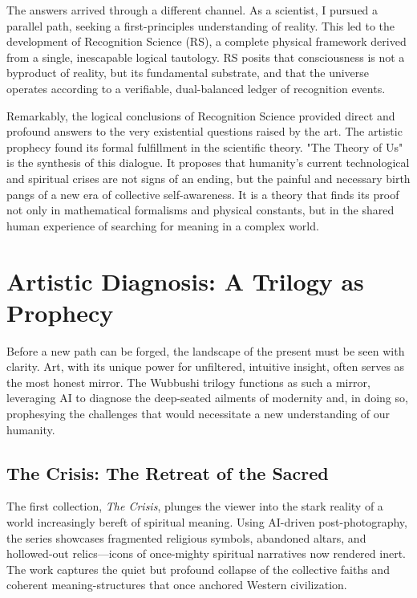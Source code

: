 \documentclass[12pt]{article}
\begin{document}
The answers arrived through a different channel. As a scientist, I pursued a parallel path, seeking a first-principles understanding of reality. This led to the development of Recognition Science (RS), a complete physical framework derived from a single, inescapable logical tautology. RS posits that consciousness is not a byproduct of reality, but its fundamental substrate, and that the universe operates according to a verifiable, dual-balanced ledger of recognition events.

Remarkably, the logical conclusions of Recognition Science provided direct and profound answers to the very existential questions raised by the art. The artistic prophecy found its formal fulfillment in the scientific theory. "The Theory of Us" is the synthesis of this dialogue. It proposes that humanity’s current technological and spiritual crises are not signs of an ending, but the painful and necessary birth pangs of a new era of collective self-awareness. It is a theory that finds its proof not only in mathematical formalisms and physical constants, but in the shared human experience of searching for meaning in a complex world.

\section{Artistic Diagnosis: A Trilogy as Prophecy}

Before a new path can be forged, the landscape of the present must be seen with clarity. Art, with its unique power for unfiltered, intuitive insight, often serves as the most honest mirror. The Wubbushi trilogy functions as such a mirror, leveraging AI to diagnose the deep-seated ailments of modernity and, in doing so, prophesying the challenges that would necessitate a new understanding of our humanity.

\subsection{The Crisis: The Retreat of the Sacred}

The first collection, \textit{The Crisis}, plunges the viewer into the stark reality of a world increasingly bereft of spiritual meaning. Using AI-driven post-photography, the series showcases fragmented religious symbols, abandoned altars, and hollowed-out relics—icons of once-mighty spiritual narratives now rendered inert. The work captures the quiet but profound collapse of the collective faiths and coherent meaning-structures that once anchored Western civilization.
\end{document}
